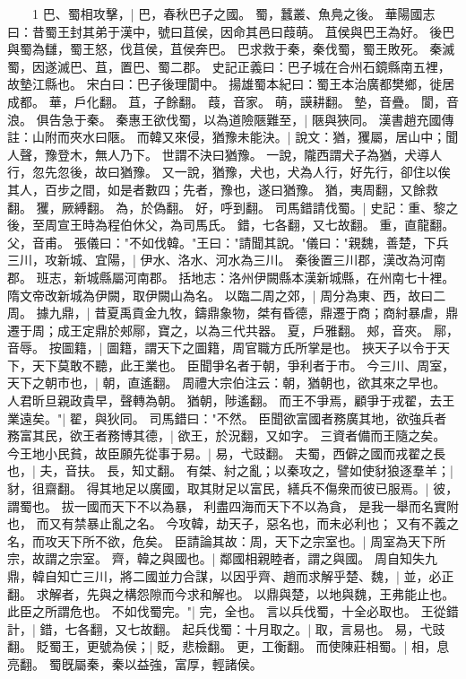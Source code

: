 　　1 巴、蜀相攻擊，|{
	巴，春秋巴子之國。
	蜀，蠶叢、魚鳧之後。
	華陽國志曰：昔蜀王封其弟于漢中，號曰苴侯，因命其邑曰葭萌。
	苴侯與巴王為好。
	後巴與蜀為讎，蜀王怒，伐苴侯，苴侯奔巴。
	巴求救于秦，秦伐蜀，蜀王敗死。
	秦滅蜀，因遂滅巴、苴，置巴、蜀二郡。
	史記正義曰：巴子城在合州石鏡縣南五裡，故墊江縣也。
	宋白曰：巴子後理閬中。
	揚雄蜀本紀曰：蜀王本治廣都樊鄉，徙居成都。
	華，戶化翻。
	苴，子餘翻。
	葭，音家。
	萌，謨耕翻。
	墊，音疊。
	閬，音浪。
}
俱告急于秦。
	秦惠王欲伐蜀，以為道險陿難至，|{
	陿與狹同。
	漢書趙充國傳註：山附而夾水曰陿。
}
而韓又來侵，猶豫未能決。|{
	說文：猶，玃屬，居山中；聞人聲，豫登木，無人乃下。
	世謂不決曰猶豫。
	一說，隴西謂犬子為猶，犬導人行，忽先忽後，故曰猶豫。
	又一說，猶豫，犬也，犬為人行，好先行，卻住以俟其人，百步之間，如是者數四；先者，豫也，遂曰猶豫。
	猶，夷周翻，又餘救翻。
	玃，厥縛翻。
	為，於偽翻。
	好，呼到翻。
}
司馬錯請伐蜀。|{
	史記：重、黎之後，至周宣王時為程伯休父，為司馬氏。
	錯，七各翻，又七故翻。
	重，直龍翻。
	父，音甫。
}
張儀曰："不如伐韓。"王曰："請聞其說。"儀曰："親魏，善楚，下兵三川，攻新城、宜陽，|{
	伊水、洛水、河水為三川。
	秦後置三川郡，漢改為河南郡。
	班志，新城縣屬河南郡。
	括地志：洛州伊闕縣本漢新城縣，在州南七十裡。
	隋文帝改新城為伊闕，取伊闕山為名。
}
以臨二周之郊，|{
	周分為東、西，故曰二周。
}
據九鼎，|{
	昔夏禹貢金九牧，鑄鼎象物，桀有昏德，鼎遷于商；商紂暴虐，鼎遷于周；成王定鼎於郟鄏，寶之，以為三代共器。
	夏，戶雅翻。
	郟，音夾。
	鄏，音辱。
}
按圖籍，|{
	圖籍，謂天下之圖籍，周官職方氏所掌是也。
}
挾天子以令于天下，天下莫敢不聽，此王業也。
	臣聞爭名者于朝，爭利者于市。
	今三川、周室，天下之朝市也，|{
	朝，直遙翻。
	周禮大宗伯注云：朝，猶朝也，欲其來之早也。
	人君昕旦親政貴早，聲轉為朝。
	猶朝，陟遙翻。
}
而王不爭焉，顧爭于戎翟，去王業遠矣。"|{
	翟，與狄同。
}
司馬錯曰："不然。
	臣聞欲富國者務廣其地，欲強兵者務富其民，欲王者務博其德，|{
	欲王，於況翻，又如字。
}
三資者備而王隨之矣。
	今王地小民貧，故臣願先從事于易。|{
	易，弋豉翻。
}
夫蜀，西僻之國而戎翟之長也，|{
	夫，音扶。
	長，知丈翻。
}
有桀、紂之亂；以秦攻之，譬如使豺狼逐羣羊；|{
	豺，徂齋翻。
}
得其地足以廣國，取其財足以富民，繕兵不傷衆而彼已服焉。|{
	彼，謂蜀也。
}
拔一國而天下不以為暴，
利盡四海而天下不以為貪，
是我一舉而名實附也，
而又有禁暴止亂之名。
今攻韓，劫天子，惡名也，而未必利也；
又有不義之名，而攻天下所不欲，危矣。
臣請論其故：周，天下之宗室也。|{
	周室為天下所宗，故謂之宗室。
}
齊，韓之與國也。|{
	鄰國相親睦者，謂之與國。
}
周自知失九鼎，韓自知亡三川，將二國並力合謀，以因乎齊、趙而求解乎楚、魏，|{
	並，必正翻。
	求解者，先與之構怨隙而今求和解也。
}
以鼎與楚，以地與魏，王弗能止也。
	此臣之所謂危也。
	不如伐蜀完。"|{
	完，全也。
	言以兵伐蜀，十全必取也。
}
王從錯計，|{
	錯，七各翻，又七故翻。
}
起兵伐蜀：十月取之。|{
	取，言易也。
	易，弋豉翻。
}
貶蜀王，更號為侯；|{
	貶，悲檢翻。
	更，工衡翻。
}
而使陳莊相蜀。|{
	相，息亮翻。
}
蜀旣屬秦，秦以益強，富厚，輕諸侯。



